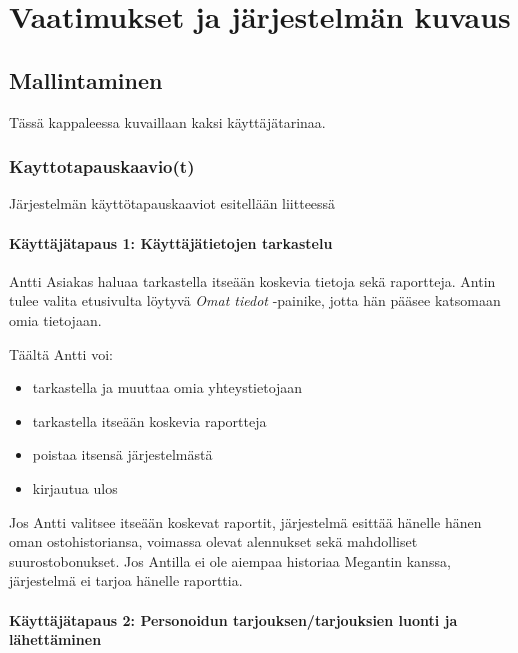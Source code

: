 \chapter{Vaatimukset ja järjestelmän kuvaus} %
\label{kuvaus} %
\thispagestyle{fancy} %


\section{Mallintaminen}  %
    Tässä kappaleessa kuvaillaan kaksi käyttäjätarinaa. 

\subsection{Kayttotapauskaavio(t)}    %

    Järjestelmän käyttötapauskaaviot esitellään liitteessä %

\subsubsection{Käyttäjätapaus 1: Käyttäjätietojen tarkastelu}   %

    Antti Asiakas haluaa tarkastella itseään koskevia tietoja sekä raportteja. Antin tulee valita etusivulta löytyvä
    \textit{Omat tiedot} -painike, jotta hän pääsee katsomaan omia tietojaan. 

    Täältä Antti voi:

    \begin{itemize}
        \item tarkastella ja muuttaa omia yhteystietojaan
        \item tarkastella itseään koskevia raportteja
        \item poistaa itsensä järjestelmästä
        \item kirjautua ulos
    \end{itemize}

    Jos Antti valitsee itseään koskevat raportit, järjestelmä esittää hänelle hänen oman ostohistoriansa,
    voimassa olevat alennukset sekä mahdolliset suurostobonukset.
    Jos Antilla ei ole aiempaa historiaa Megantin kanssa, järjestelmä ei tarjoa hänelle raporttia.

\subsubsection{Käyttäjätapaus 2: Personoidun tarjouksen/tarjouksien luonti ja lähet\-täminen}     %

